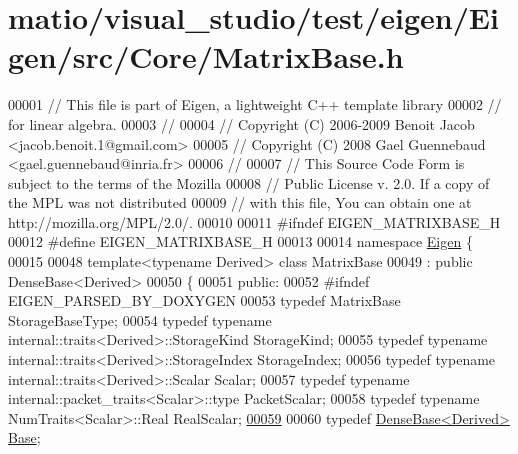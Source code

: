\hypertarget{matio_2visual__studio_2test_2eigen_2_eigen_2src_2_core_2_matrix_base_8h_source}{}\section{matio/visual\+\_\+studio/test/eigen/\+Eigen/src/\+Core/\+Matrix\+Base.h}
\label{matio_2visual__studio_2test_2eigen_2_eigen_2src_2_core_2_matrix_base_8h_source}

\begin{DoxyCode}
00001 \textcolor{comment}{// This file is part of Eigen, a lightweight C++ template library}
00002 \textcolor{comment}{// for linear algebra.}
00003 \textcolor{comment}{//}
00004 \textcolor{comment}{// Copyright (C) 2006-2009 Benoit Jacob <jacob.benoit.1@gmail.com>}
00005 \textcolor{comment}{// Copyright (C) 2008 Gael Guennebaud <gael.guennebaud@inria.fr>}
00006 \textcolor{comment}{//}
00007 \textcolor{comment}{// This Source Code Form is subject to the terms of the Mozilla}
00008 \textcolor{comment}{// Public License v. 2.0. If a copy of the MPL was not distributed}
00009 \textcolor{comment}{// with this file, You can obtain one at http://mozilla.org/MPL/2.0/.}
00010 
00011 \textcolor{preprocessor}{#ifndef EIGEN\_MATRIXBASE\_H}
00012 \textcolor{preprocessor}{#define EIGEN\_MATRIXBASE\_H}
00013 
00014 \textcolor{keyword}{namespace }\hyperlink{namespace_eigen}{Eigen} \{
00015 
00048 \textcolor{keyword}{template}<\textcolor{keyword}{typename} Derived> \textcolor{keyword}{class }MatrixBase
00049   : \textcolor{keyword}{public} DenseBase<Derived>
00050 \{
00051   \textcolor{keyword}{public}:
00052 \textcolor{preprocessor}{#ifndef EIGEN\_PARSED\_BY\_DOXYGEN}
00053     \textcolor{keyword}{typedef} MatrixBase StorageBaseType;
00054     \textcolor{keyword}{typedef} \textcolor{keyword}{typename} internal::traits<Derived>::StorageKind StorageKind;
00055     \textcolor{keyword}{typedef} \textcolor{keyword}{typename} internal::traits<Derived>::StorageIndex StorageIndex;
00056     \textcolor{keyword}{typedef} \textcolor{keyword}{typename} internal::traits<Derived>::Scalar Scalar;
00057     \textcolor{keyword}{typedef} \textcolor{keyword}{typename} internal::packet\_traits<Scalar>::type PacketScalar;
00058     \textcolor{keyword}{typedef} \textcolor{keyword}{typename} NumTraits<Scalar>::Real RealScalar;
\hyperlink{group___core___module_a8ceab546dd934174888bea8b7514ea47}{00059} 
00060     \textcolor{keyword}{typedef} \hyperlink{group___core___module_class_eigen_1_1_dense_base}{DenseBase<Derived>} \hyperlink{class_eigen_1_1_dense_coeffs_base}{Base};

\end{DoxyCode}
